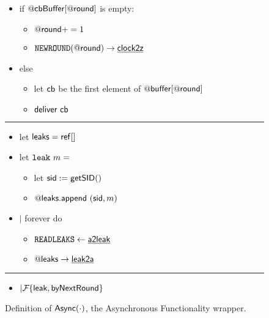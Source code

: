 \begin{figure}[h!]
\begin{boxedminipage}{\columnwidth}
\begin{itemize}[leftmargin=2mm]
\begin{itemize}[leftmargin=3mm]
      \item[] if $@{\mathsf {cbBuffer}}[@{\mathsf {round}}]$ is empty:
        \begin{itemize}[leftmargin=4mm]
        \item[] $@{\mathsf {round}} += 1$
        \item[] $\mathtt {NEWROUND}(@{\mathsf {round}}) \rightarrow {\underline{\smash{\ensuremath{{\mathsf {clock2z}}}}}}$
        \end{itemize}
      \item[] else
        \begin{itemize}[leftmargin=4mm]
        \item[] let ${\mathsf {cb}}$ be the first element of $@{\mathsf {buffer}}[@{\mathsf {round}}]$
        \item[] ${\mathsf {deliver}}~ {\mathsf {cb}}$
        \end{itemize}
    \end{itemize}
\end{itemize}
\hrule
\begin{itemize}[leftmargin=2mm]
\item[] let ${\mathsf {leaks}} = {\mathsf {ref}} []$
\item[] let $\mathtt {leak}~ m =$
  \begin{itemize}[leftmargin=3mm]
    \item[] let ${\mathsf {sid}} := {\mathsf {getSID}}()$
    \item[] $@{\mathsf {leaks}}.{\mathsf {append}}~ ({\mathsf {sid}},m)$
  \end{itemize}
\item[] $|$ forever do
  \begin{itemize}
    \item[] $\mathtt {READLEAKS} \leftarrow {\underline{\smash{\ensuremath{{\mathsf {a2leak}}}}}}$
    \item[] $@{\mathsf {leaks}} \rightarrow {\underline{\smash{\ensuremath{{\mathsf {leak2a}}}}}}$
  \end{itemize}
\end{itemize}
\hrule
\begin{itemize}[leftmargin=2mm]
\item[] $| \F{}\{\msf{leak},\msf{byNextRound}\}$
\end{itemize}
\end{boxedminipage}
\caption{
\label{fig:async}
Definition of ${\mathsf {Async}}(\cdot)$, the Asynchronous Functionality wrapper.
}
\end{figure}


